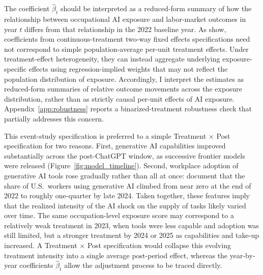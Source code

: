 \documentclass[11pt]{article}
\theoremstyle{plain}
\theoremstyle{remark}
\begin{document}
The coefficient $\hat\beta_t$ should be interpreted as a reduced-form summary of how the relationship between occupational AI exposure and labor-market outcomes in year $t$ differs from that relationship in the 2022 baseline year. As \textcite{callaway2024continuous} show, coefficients from continuous-treatment two-way fixed effects specifications need not correspond to simple population-average per-unit treatment effects. Under treatment-effect heterogeneity, they can instead aggregate underlying exposure-specific effects using regression-implied weights that may not reflect the population distribution of exposure. Accordingly, I interpret the estimates as reduced-form summaries of relative outcome movements across the exposure distribution, rather than as strictly causal per-unit effects of AI exposure. Appendix~\ref{app:robustness} reports a binarized-treatment robustness check that partially addresses this concern.

This event-study specification is preferred to a simple Treatment $\times$ Post specification for two reasons. First, generative AI capabilities improved substantially across the post-ChatGPT window, as successive frontier models were released (Figure~\ref{fig:model_timeline}). Second, workplace adoption of generative AI tools rose gradually rather than all at once: \textcite{bick2024rapid} document that the share of U.S.\ workers using generative AI climbed from near zero at the end of 2022 to roughly one-quarter by late 2024. Taken together, these features imply that the realized intensity of the AI shock on the supply of tasks likely varied over time. The same occupation-level exposure score may correspond to a relatively weak treatment in 2023, when tools were less capable and adoption was still limited, but a stronger treatment by 2024 or 2025 as capabilities and take-up increased. A Treatment $\times$ Post specification would collapse this evolving treatment intensity into a single average post-period effect, whereas the year-by-year coefficients ${\hat\beta_t}$ allow the adjustment process to be traced directly.
\end{document}
